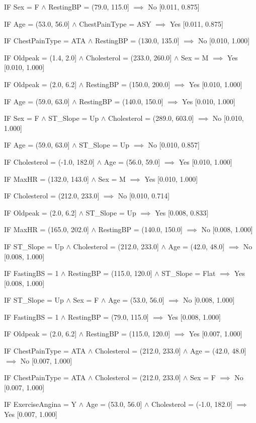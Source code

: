 IF Sex = F $\land$ RestingBP = (79.0, 115.0] $\implies$ No [0.011, 0.875]

IF Age = (53.0, 56.0] $\land$ ChestPainType = ASY $\implies$ Yes [0.011, 0.875]

IF ChestPainType = ATA $\land$ RestingBP = (130.0, 135.0] $\implies$ No [0.010, 1.000]

IF Oldpeak = (1.4, 2.0] $\land$ Cholesterol = (233.0, 260.0] $\land$ Sex = M $\implies$ Yes [0.010, 1.000]

IF Oldpeak = (2.0, 6.2] $\land$ RestingBP = (150.0, 200.0] $\implies$ Yes [0.010, 1.000]

IF Age = (59.0, 63.0] $\land$ RestingBP = (140.0, 150.0] $\implies$ Yes [0.010, 1.000]

IF Sex = F $\land$ ST_Slope = Up $\land$ Cholesterol = (289.0, 603.0] $\implies$ No [0.010, 1.000]

IF Age = (59.0, 63.0] $\land$ ST_Slope = Up $\implies$ No [0.010, 0.857]

IF Cholesterol = (-1.0, 182.0] $\land$ Age = (56.0, 59.0] $\implies$ Yes [0.010, 1.000]

IF MaxHR = (132.0, 143.0] $\land$ Sex = M $\implies$ Yes [0.010, 1.000]

IF Cholesterol = (212.0, 233.0] $\implies$ No [0.010, 0.714]

IF Oldpeak = (2.0, 6.2] $\land$ ST_Slope = Up $\implies$ Yes [0.008, 0.833]

IF MaxHR = (165.0, 202.0] $\land$ RestingBP = (140.0, 150.0] $\implies$ No [0.008, 1.000]

IF ST_Slope = Up $\land$ Cholesterol = (212.0, 233.0] $\land$ Age = (42.0, 48.0] $\implies$ No [0.008, 1.000]

IF FastingBS = 1 $\land$ RestingBP = (115.0, 120.0] $\land$ ST_Slope = Flat $\implies$ Yes [0.008, 1.000]

IF ST_Slope = Up $\land$ Sex = F $\land$ Age = (53.0, 56.0] $\implies$ No [0.008, 1.000]

IF FastingBS = 1 $\land$ RestingBP = (79.0, 115.0] $\implies$ Yes [0.008, 1.000]

IF Oldpeak = (2.0, 6.2] $\land$ RestingBP = (115.0, 120.0] $\implies$ Yes [0.007, 1.000]

IF ChestPainType = ATA $\land$ Cholesterol = (212.0, 233.0] $\land$ Age = (42.0, 48.0] $\implies$ No [0.007, 1.000]

IF ChestPainType = ATA $\land$ Cholesterol = (212.0, 233.0] $\land$ Sex = F $\implies$ No [0.007, 1.000]

IF ExerciseAngina = Y $\land$ Age = (53.0, 56.0] $\land$ Cholesterol = (-1.0, 182.0] $\implies$ Yes [0.007, 1.000]

